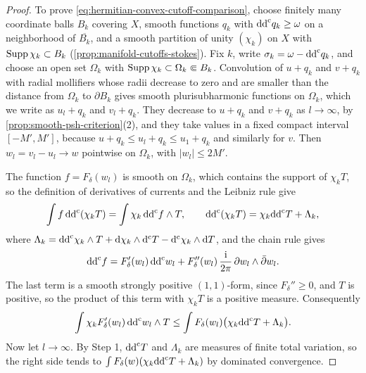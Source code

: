 \begin{proof}
To prove \eqref{eq:hermitian-convex-cutoff-comparison}, choose finitely many coordinate balls $B_k$ covering $X$, smooth functions $q_k$ with $\mathrm{dd}^{\mathrm{c}} q_k\geq\omega$ on a neighborhood of $\overline{B_k}$, and a smooth partition of unity $(\chi_k)$ on $X$ with $\operatorname{Supp}\chi_k\subset B_k$ (\cref{prop:manifold-cutoffs-stokes}). Fix $k$, write $\sigma_k=\omega-\mathrm{dd}^{\mathrm{c}} q_k$, and choose an open set $\Omega_k$ with $\operatorname{Supp}\chi_k\subset\Omega_k\Subset B_k$. Convolution of $u+q_k$ and $v+q_k$ with radial mollifiers whose radii decrease to zero and are smaller than the distance from $\Omega_k$ to $\partial B_k$ gives smooth plurisubharmonic functions on $\Omega_k$, which we write as $u_l+q_k$ and $v_l+q_k$. They decrease to $u+q_k$ and $v+q_k$ as $l\to\infty$, by \cref{prop:smooth-psh-criterion}(2), and they take values in a fixed compact interval $[-M',M']$, because $u+q_k\leq u_l+q_k\leq u_1+q_k$ and similarly for $v$. Then $w_l=v_l-u_l\to w$ pointwise on $\Omega_k$, with $|w_l|\leq2M'$.

The function $f=F_\delta(w_l)$ is smooth on $\Omega_k$, which contains the support of $\chi_kT$, so the definition of derivatives of currents and the Leibniz rule give
\[
 \int f\,\mathrm{dd}^{\mathrm{c}}(\chi_kT)=\int\chi_k\,\mathrm{dd}^{\mathrm{c}} f\wedge T,\qquad
 \mathrm{dd}^{\mathrm{c}}(\chi_kT)=\chi_k\mathrm{dd}^{\mathrm{c}} T+\Lambda_k,
\]
where $\Lambda_k=\mathrm{dd}^{\mathrm{c}}\chi_k\wedge T+\mathrm d\chi_k\wedge\mathrm d^{\mathrm c}T-\mathrm d^{\mathrm c}\chi_k\wedge\mathrm dT$, and the chain rule gives
\[
 \mathrm{dd}^{\mathrm{c}} f=F_\delta'(w_l)\,\mathrm{dd}^{\mathrm{c}} w_l+F_\delta''(w_l)\,\frac{\mathrm i}{2\pi}\,\partial w_l\wedge\bar\partial w_l.
\]
The last term is a smooth strongly positive $(1,1)$-form, since $F_\delta''\geq0$, and $T$ is positive, so the product of this term with $\chi_kT$ is a positive measure. Consequently
\begin{equation}\label{eq:hermitian-local-cutoff-inequality}
 \int\chi_kF_\delta'(w_l)\,\mathrm{dd}^{\mathrm{c}} w_l\wedge T\leq\int F_\delta(w_l)\bigl(\chi_k\mathrm{dd}^{\mathrm{c}} T+\Lambda_k\bigr).
\end{equation}
Now let $l\to\infty$. By Step 1, $\mathrm{dd}^{\mathrm{c}} T$ and $\Lambda_k$ are measures of finite total variation, so the right side tends to $\int F_\delta(w)(\chi_k\mathrm{dd}^{\mathrm{c}} T+\Lambda_k)$ by dominated convergence.


\end{proof}
